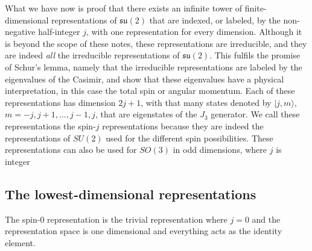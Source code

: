 \documentclass[notes.tex]{subfiles}
\begin{document}
What we have now is proof that there exists an infinite tower of finite-dimensional representations of $\mathfrak{su}(2)$ that are indexed, or labeled, by the non-negative half-integer $j$, with one representation for every dimension. Although it is beyond the scope of these notes, these representations are irreducible, and they are indeed {\it all} the irreducible representations of $\mathfrak{su}(2)$. This fulfils the promise of Schur's lemma, namely that the irreducible representations are labeled by the eigenvalues of the Casimir, and show that these eigenvalues have a physical interpretation, in this case the total spin or angular momentum. Each of these representations has dimension $2j+1$, with that many states denoted by $|j,m\rangle$, $m=-j,j+1,\ldots,j-1,j$, that are eigenstates of the $J_3$ generator. We call these representations the spin-$j$ representations because they are indeed the representations of $SU(2)$ used for the different spin possibilities.
These representations can also be used for $SO(3)$ in odd dimensions, where $j$ is integer

\subsection{The lowest-dimensional representations}
The spin-0 representation is the trivial representation where $j=0$ and the representation space is one dimensional and everything acts as the identity element. 
\end{document}
